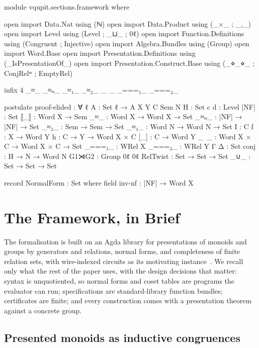 \begin{code}[hide]
module vqupit.sections.framework where

open import Data.Nat using (ℕ)
open import Data.Product using (_×_ ; _,_)
open import Level using (Level ; _⊔_ ; 0ℓ)
open import Function.Definitions using (Congruent ; Injective)
open import Algebra.Bundles using (Group)
open import Word.Base
open import Presentation.Definitions using (_IsPresentationOf_)
open import Presentation.Construct.Base using (_⋄_⋄_ ; ConjRelʷ ; EmptyRel)

infix 4 _≈_ _≈ₙ_ _≈₁_ _≈₂_ _~_ _===₁_ _===₂_

postulate
  proof-elided : ∀ {ℓ} {A : Set ℓ} → A
  X Y C Sem N H : Set
  c d : Level
  |NF| : Set
  ⟦_⟧ : Word X → Sem
  _≈_ : Word X → Word X → Set
  _≈ₙ_ : |NF| → |NF| → Set
  _≈₂_ : Sem → Sem → Set
  _≈₁_ : Word N → Word N → Set
  I : C
  f : X → Word Y
  h : C → Y → Word X × C
  [_] : C → Word Y
  _~_ : Word X × C → Word X × C → Set
  _===₁_ : WRel X
  _===₂_ : WRel Y
  Γ Δ : Set
  conj : H → N → Word N
  G1⋊G2 : Group 0ℓ 0ℓ
  RelTwist : Set → Set → Set
  _∪_ : Set → Set → Set

record NormalForm : Set where
  field inv-nf : |NF| → Word X
\end{code}
\section{The Framework, in Brief}\label{sec:framework}

The formalisation is built on an Agda library for presentations of
monoids and groups by generators and relations, normal forms, and
completeness of finite relation sets, with wire-indexed circuits as its
motivating instance~\cite{bian2026framework,qupit-code}.  We recall only
what the rest of the paper uses, with the design decisions that
matter: syntax is unquotiented, so normal forms and coset tables are
programs the evaluator can run; specifications are standard-library
function bundles; certificates are finite; and every construction comes
with a presentation theorem against a concrete group.

\subsection{Presented monoids as inductive congruences}\label{sec:presentations}

